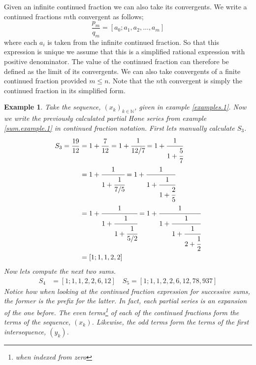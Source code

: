 \documentclass{article}
\newtheorem{example}{Example}[section]
\theoremstyle{remark}
\theoremstyle{definition}
\begin{document}
Given an infinite continued fraction we can also take its convergents. We write a continued fractions $m$th convergent as follows;
\begin{equation}
    \frac{p_m}{q_m} = [a_0;a_1,a_2,\dots,a_m]
\end{equation}
where each $a_i$ is taken from the infinite continued fraction. So that this expression is unique we assume that this is a simplified rational expression with positive denominator. The value of the continued fraction can therefore be defined as the limit of its convergents. We can also take convergents of a finite continued fraction provided $m \leq n$. Note that the $n$th convergent is simply the continued fraction in its simplified form.

\begin{example}\label{cfrac.example.1}
Take the sequence, $(x_k)_{k\in\mathbb{N}}$, given in example \ref{examples.1}. Now we write the previously calculated partial Hone series from example \ref{sum.example.1} in continued fraction notation. First lets manually calculate $S_3$.
\begin{align*}
    S_3 = \frac{19}{12} &= 1 + \frac{7}{12} = 1 + \cfrac{1}{12/7} = 1 + \cfrac{1}{1+\cfrac{5}{7}} \\
    &= 1 + \cfrac{1}{1+\cfrac{1}{7/5}} = 1 + \cfrac{1}{1+\cfrac{1}{1+\cfrac{2}{5}}} \\
    &= 1 + \cfrac{1}{1+\cfrac{1}{1+\cfrac{1}{5/2}}} = 1 + \cfrac{1}{1+\cfrac{1}{1+\cfrac{1}{2+\cfrac{1}{2}}}} \\
    &= [1;1,1,2,2]
\end{align*}
Now lets compute the next two sums.
\begin{align*}
    S_4 &= [1;1,1,2,2,6,12] \quad S_5 = [1;1,1,2,2,6,12,78,937]
\end{align*}
Notice how when looking at the continued fraction expression for successive sums, the former is the prefix for the latter. In fact, each partial series is an expansion of the one before.
The even terms\footnote{when indexed from zero} of each of the continued fractions form the terms of the sequence, $(x_k)$. Likewise, the odd terms form the terms of the first intersequence, $(y_k)$.
\end{example}
\end{document}
